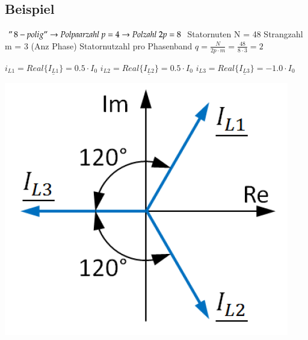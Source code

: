 \subsection{Beispiel}
    \begin{minipage}{0.5\linewidth}	
        $ "\,8-polig "  \rightarrow  Polpaarzahl \; p = 4   \rightarrow  Polzahl \;2p = 8$\newline
        Statornuten N = 48  \newline
        Strangzahl m = 3 (Anz Phase)\newline
        Statornutzahl pro Phasenband $q = \frac{N}{2p \cdot m}= \frac{48}{8 \cdot 3}=2 $\newline
    \end{minipage} 
    \begin{minipage}{0.3\linewidth}
        $i_{L1} = Real\{\underline{I_{L1}}\} = 0.5\cdot I_0$ \newline \newline
        $i_{L2} = Real\{\underline{I_{L2}}\} = 0.5\cdot I_0$ \newline \newline
        $i_{L3} = Real\{\underline{I_{L3}}\} = -1.0\cdot I_0$ 
    \end{minipage}
    \begin{minipage}{0.3\linewidth}
    \includegraphics[scale = 0.3]{images/StromdreieckAGS}
\end{minipage}
\vspace{-1cm}
